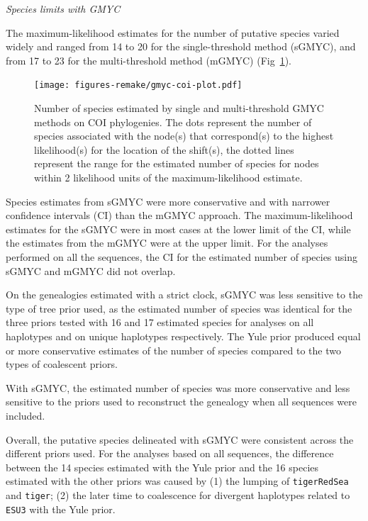 \documentclass[12pt,letterpaper]{article}\usepackage[]{graphicx}\usepackage[]{color}
\renewcommand{\subsection}[1]{%
\bigskip
\begin{center}
\begin{large}
\normalfont\itshape #1
\end{large}
\end{center}}
\begin{document}
\subsection{Species limits with GMYC}





The maximum-likelihood estimates for the number of putative species varied
widely and ranged from 14 to 20 for the
single-threshold method (sGMYC), and from 17 to 23
for the multi-threshold method (mGMYC) (Fig~\ref{fig:gmyc-coi-plot}).


\begin{figure}
  {\centering \texttt{[image: figures-remake/gmyc-coi-plot.pdf]}}

  \caption{Number of species estimated by single and multi-threshold GMYC
    methods on COI phylogenies. The dots represent the number of species
    associated with the node(s) that correspond(s) to the highest likelihood(s)
    for the location of the shift(s), the dotted lines represent the range for
    the estimated number of species for nodes within 2 likelihood units of the
    maximum-likelihood estimate.}\label{fig:gmyc-coi-plot}
\end{figure}


Species estimates from sGMYC were more conservative and with narrower confidence
intervals (CI) than the mGMYC approach. The maximum-likelihood estimates for the
sGMYC were in most cases at the lower limit of the CI, while the estimates from
the mGMYC were at the upper limit. For the analyses performed on all the
sequences, the CI for the estimated number of species using sGMYC and mGMYC did
not overlap.

On the genealogies estimated with a strict clock, sGMYC was less sensitive to
the type of tree prior used, as the estimated number of species was identical
for the three priors tested with 16 and
17 estimated species for analyses on all
haplotypes and on unique haplotypes respectively. The Yule prior produced equal
or more conservative estimates of the number of species compared to the two
types of coalescent priors.

With sGMYC, the estimated number of species was more conservative and less
sensitive to the priors used to reconstruct the genealogy when all sequences
were included.

Overall, the putative species delineated with sGMYC were consistent across the
different priors used. For the analyses based on all sequences, the difference
between the 14 species estimated with the Yule prior and the 16 species
estimated with the other priors was caused by (1) the lumping of
\texttt{tigerRedSea} and \texttt{tiger}; (2) the later time to coalescence for
divergent haplotypes related to \texttt{ESU3} with the Yule prior.
\end{document}
